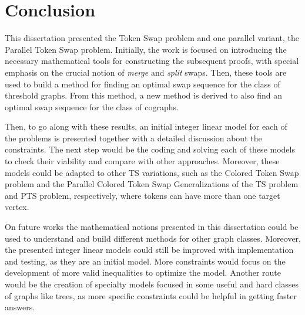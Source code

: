 \documentclass[msc,english,table,xcdraw]{ppgccufmg}
\begin{document}
\chapter{Conclusion}

This dissertation presented the Token Swap problem and one parallel variant, 
the Parallel Token Swap problem.
Initially, the work is focused on introducing the necessary mathematical tools
for constructing the subsequent proofs, with special emphasis on the crucial 
notion of \textit{merge} and \textit{split} swaps.
Then, these tools are used to build a method for finding an optimal
swap sequence for the class of threshold graphs.
From this method, a new method is derived to also find an optimal swap sequence
for the class of cographs.

Then, to go along with these results, an initial integer linear model for each
of the problems is presented together with a detailed discussion about the 
constraints.
The next step would be the coding and solving each of these models to 
check their viability and compare with other approaches.
Moreover, these models could be adapted to other TS variations, such as the 
Colored Token Swap problem and the Parallel Colored Token Swap
Generalizations of the TS problem and PTS problem, respectively, where tokens
can have more than one target vertex.


On future works the mathematical notions presented in this dissertation could 
be used to understand and build different methods for other graph classes.
Moreover, the presented integer linear models could still be improved with 
implementation and testing, as they are an initial model.
More constraints would focus on the development of more valid inequalities to
optimize the model.
Another route would be the creation of specialty models focused in some useful 
and hard classes of graphs like trees, as more specific constraints could be 
helpful in getting faster answers.

\renewcommand\bibname{References} %




\begin{appendices}
\end{appendices}
\end{document}
